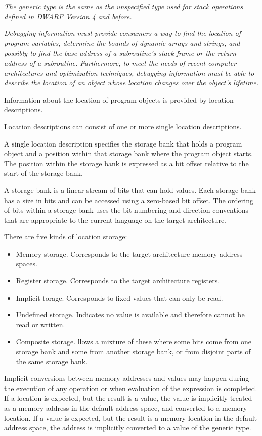 \textit{The generic type is the same as the unspecified type used for
stack operations defined in DWARF Version 4 and before.}

\textit{Debugging information must provide consumers a way to
find the location of program variables, determine the bounds of dynamic
arrays and strings, and possibly to find the base address of a
subroutine’s stack frame or the return address of a subroutine.
Furthermore, to meet the needs of recent computer architectures and
optimization techniques, debugging information must be able to describe
the location of an object whose location changes over the object’s
lifetime.}

Information about the location of program objects is provided by
location descriptions.

Location descriptions can consist of one or more single location
descriptions.

A single location description specifies the storage bank that holds
a program object and a position within that storage bank where the
program object starts. The position within the storage bank is
expressed as a bit offset relative to the start of the storage bank.
 
A storage bank is a linear stream of bits that can hold values. Each
storage bank has a size in bits and can be accessed using a
zero-based bit offset. The ordering of bits within a storage bank
uses the bit numbering and direction conventions that are appropriate to
the current language on the target architecture.

There are five kinds of location storage:

\begin{itemize}
\item Memory storage. Corresponds to the target architecture memory
address spaces.
\item Register storage. Corresponds to the target architecture
registers.
\item Implicit torage. Corresponds to fixed values that can only be
read.
\item Undefined storage. Indicates no value is available and therefore
cannot be read or written.
\item Composite storage. llows a mixture of these where some bits come
from one storage bank and some from another storage bank, or from
disjoint parts of the same storage bank.
\end{itemize}

Implicit conversions between memory addresses and values may happen
during the execution of any operation or when evaluation of the
expression is completed. If a location is expected, but the result is
a value, the value is implicitly treated as a memory address in the
default address space, and converted to a memory location. If a value
is expected, but the result is a memory location in the default
address space, the address is implicitly converted to a value of the
generic type.

